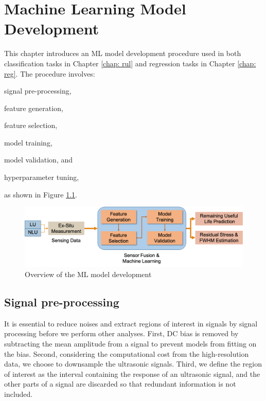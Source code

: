 \chapter{Machine Learning Model Development}
\label{chap: model}

This chapter introduces an ML model development procedure used in both classification tasks in Chapter \ref{chap: rul} and regression tasks in Chapter \ref{chap: reg}. The procedure involves:
\begin{enumerate*}[label=(\alph*)]
    \item signal pre-processing,
    \item feature generation,
    \item feature selection,
    \item model training,
    \item model validation, and
    \item hyperparameter tuning,
\end{enumerate*}
as shown in Figure \ref{fig: model development}.

\begin{figure}[tb]
    \centering
    \includegraphics[width=\linewidth]{fig/model_development.png}
    \caption{Overview of the ML model development}
    \label{fig: model development}
\end{figure}

\section{Signal pre-processing}
It is essential to reduce noises and extract regions of interest in signals by signal processing before we perform other analyses. First, DC bias is removed by subtracting the mean amplitude from a signal to prevent models from fitting on the bias. Second, considering the computational cost from the high-resolution data, we choose to downsample the ultrasonic signals. Third, we define the region of interest as the interval containing the response of an ultrasonic signal, and the other parts of a signal are discarded so that redundant information is not included.

